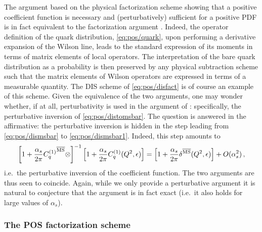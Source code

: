 The argument based on the physical factorization scheme showing that
a positive coefficient function is necessary and (perturbatively)
sufficient for a positive PDF is in fact equivalent to the
factorization argument
. Indeed, 
the operator definition of the quark distribution, \cref{eq:pos/quark},
upon performing a derivative expansion of the Wilson line, leads to
the standard expression of its moments in terms of matrix elements of
local operators. The interpretation of the bare quark distribution as
a probability  is then
preserved by any physical subtraction scheme such that the matrix
elements of Wilson operators are expressed in terms of a measurable
quantity. The DIS scheme of \cref{eq:pos/disfact} is of course an
example of this scheme. Given the equivalence of the two arguments,
one may wonder whether, if at all, perturbativity is used in the
argument of : specifically,
the perturbative inversion of \cref{eq:pos/distomsbar}. The question is
answered in the affirmative: the perturbative inversion is hidden in the step leading from \cref{eq:pos/dismsbar}
to \cref{eq:pos/dismsbar1}. Indeed, this step amounts to 
\begin{equation}\label{eq:pos/exinv}
\left[1
  +\frac{\alpha_s}{2\pi} {C_{q}^{(1)}}^{{\overline{\textrm{MS}}}}\otimes\right]^{-1} \left[1
    +\frac{\alpha_s}{2\pi} C_{q}^{(1)}(Q^2,\epsilon)\right]=
\left[1
    +\frac{\alpha_s}{2\pi} \delta^{{\overline{\textrm{MS}}}} (Q^2,\epsilon)\right]
+O(\alpha_s^2) \,,
\end{equation}
i.e.\ the perturbative inversion of the \msbar{} coefficient function. 
The two arguments are thus seen
to coincide. Again, while we only provide a perturbative argument it
is natural to conjecture that the argument is in fact exact (i.e.\ it
also holds for large values of $\alpha_s$).
 


\subsubsection{The POS factorization scheme}
\label{sec:pos/pos}

